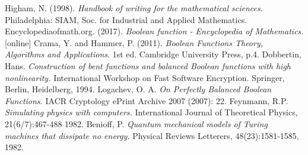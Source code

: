 \documentclass[12pt,a4paper,openright]{report}
\begin{document}
\begin{thebibliography}{20}
     Higham, N. (1998). \emph{Handbook of writing for the mathematical sciences.} Philadelphia: SIAM, Soc. for Industrial and Applied Mathematics.
     Encyclopediaofmath.org. (2017). \emph{Boolean function - Encyclopedia of Mathematics.} [online] 
     Crama, Y. and Hammer, P. (2011). \emph{Boolean Functions Theory, Algorithms and Applications}. 1st ed. Cambridge University Press, p.4.
     Dobbertin, Hans. \emph{Construction of bent functions and balanced Boolean functions with high nonlinearity.} International Workshop on Fast Software Encryption. Springer, Berlin, Heidelberg, 1994.
     Logachev, O. A. \emph{On Perfectly Balanced Boolean Functions.} IACR Cryptology ePrint Archive 2007 (2007): 22.
     Feynmann, R.P. \emph{Simulating physics with computers.} International Journal of Theoretical Physics, 21(6/7):467-488 1982.
     Benioff, P. \emph{Quantum mechanical models of Turing machines that dissipate no energy.} Physical Reviews Letterers, 48(23):1581-1585, 1982.
\end{thebibliography}
\end{document}
